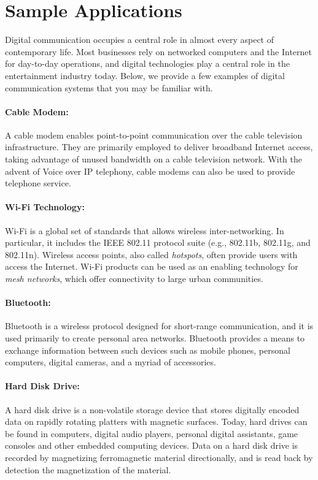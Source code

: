 \section{Sample Applications}

Digital communication occupies a central role in almost every aspect of contemporary life.
Most businesses rely on networked computers and the Internet for day-to-day operations, and digital technologies play a central role in the entertainment industry today.
Below, we provide a few examples of digital communication systems that you may be familiar with.

\paragraph{Cable Modem:}
A cable modem enables point-to-point communication over the cable television infrastructure.
They are primarily employed to deliver broadband Internet access, taking advantage of unused bandwidth on a cable television network.
With the advent of Voice over IP telephony, cable modems can also be used to provide telephone service.

\paragraph{Wi-Fi Technology:}
Wi-Fi is a global set of standards that allows wireless inter-networking.
In particular, it includes the IEEE 802.11 protocol suite (e.g., 802.11b, 802.11g, and 802.11n).
Wireless access points, also called \emph{hotspots}, often provide users with access the Internet.
Wi-Fi products can be used as an enabling technology for \emph{mesh networks}, which offer connectivity to large urban communities.

\paragraph{Bluetooth:}
Bluetooth is a wireless protocol designed for short-range communication, and it is used primarily to create personal area networks.
Bluetooth provides a means to exchange information between such devices such as mobile phones, personal computers, digital cameras, and a myriad of accessories.

\paragraph{Hard Disk Drive:}
A hard disk drive is a non-volatile storage device that stores digitally encoded data on rapidly rotating platters with magnetic surfaces.
Today, hard drives can be found in computers, digital audio players, personal digital assistants, game consoles and other embedded computing devices.
Data on a hard disk drive is recorded by magnetizing ferromagnetic material directionally, and is read back by detection the magnetization of the material.

